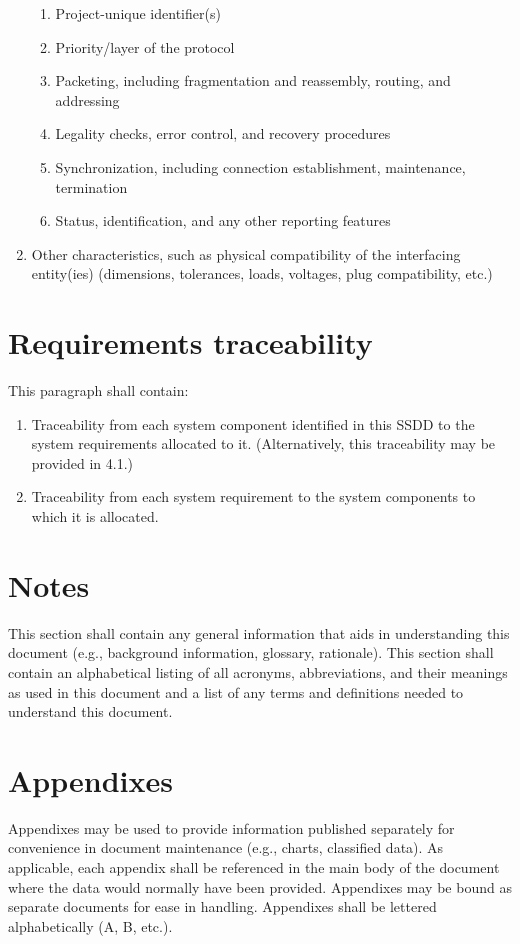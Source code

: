 \documentclass{fidata-report-template}
\begin{document}
\begin{enumerate}
  \begin{enumerate}
  \itemsep1pt\parskip0pt
  \item
    Project-unique identifier(s)
  \item
    Priority/layer of the protocol
  \item
    Packeting, including fragmentation and reassembly, routing, and
    addressing
  \item
    Legality checks, error control, and recovery procedures
  \item
    Synchronization, including connection establishment, maintenance,
    termination
  \item
    Status, identification, and any other reporting features
  \end{enumerate}
\item
  Other characteristics, such as physical compatibility of the
  interfacing entity(ies) (dimensions, tolerances, loads, voltages, plug
  compatibility, etc.)
\end{enumerate}

\section{Requirements traceability}

This paragraph shall contain:

\begin{enumerate}
\itemsep1pt\parskip0pt
\item
  Traceability from each system component identified in this SSDD to the
  system requirements allocated to it. (Alternatively, this traceability
  may be provided in 4.1.)
\item
  Traceability from each system requirement to the system components to
  which it is allocated.
\end{enumerate}

\section{Notes}

This section shall contain any general information that aids in
understanding this document (e.g., background information, glossary,
rationale). This section shall contain an alphabetical listing of all
acronyms, abbreviations, and their meanings as used in this document and
a list of any terms and definitions needed to understand this document.

\appendix

\section{Appendixes}

Appendixes may be used to provide information published separately for
convenience in document maintenance (e.g., charts, classified data). As
applicable, each appendix shall be referenced in the main body of the
document where the data would normally have been provided. Appendixes
may be bound as separate documents for ease in handling. Appendixes
shall be lettered alphabetically (A, B, etc.).
\end{document}
